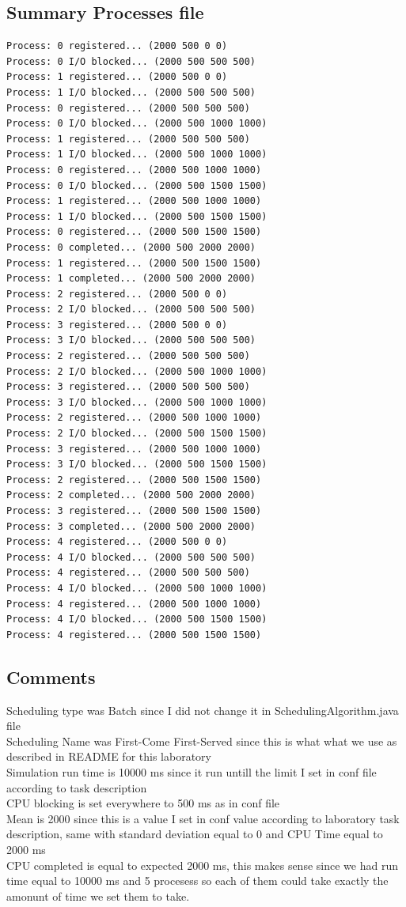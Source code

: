 \subsection{Summary Processes file}
\begin{lstlisting}
Process: 0 registered... (2000 500 0 0)
Process: 0 I/O blocked... (2000 500 500 500)
Process: 1 registered... (2000 500 0 0)
Process: 1 I/O blocked... (2000 500 500 500)
Process: 0 registered... (2000 500 500 500)
Process: 0 I/O blocked... (2000 500 1000 1000)
Process: 1 registered... (2000 500 500 500)
Process: 1 I/O blocked... (2000 500 1000 1000)
Process: 0 registered... (2000 500 1000 1000)
Process: 0 I/O blocked... (2000 500 1500 1500)
Process: 1 registered... (2000 500 1000 1000)
Process: 1 I/O blocked... (2000 500 1500 1500)
Process: 0 registered... (2000 500 1500 1500)
Process: 0 completed... (2000 500 2000 2000)
Process: 1 registered... (2000 500 1500 1500)
Process: 1 completed... (2000 500 2000 2000)
Process: 2 registered... (2000 500 0 0)
Process: 2 I/O blocked... (2000 500 500 500)
Process: 3 registered... (2000 500 0 0)
Process: 3 I/O blocked... (2000 500 500 500)
Process: 2 registered... (2000 500 500 500)
Process: 2 I/O blocked... (2000 500 1000 1000)
Process: 3 registered... (2000 500 500 500)
Process: 3 I/O blocked... (2000 500 1000 1000)
Process: 2 registered... (2000 500 1000 1000)
Process: 2 I/O blocked... (2000 500 1500 1500)
Process: 3 registered... (2000 500 1000 1000)
Process: 3 I/O blocked... (2000 500 1500 1500)
Process: 2 registered... (2000 500 1500 1500)
Process: 2 completed... (2000 500 2000 2000)
Process: 3 registered... (2000 500 1500 1500)
Process: 3 completed... (2000 500 2000 2000)
Process: 4 registered... (2000 500 0 0)
Process: 4 I/O blocked... (2000 500 500 500)
Process: 4 registered... (2000 500 500 500)
Process: 4 I/O blocked... (2000 500 1000 1000)
Process: 4 registered... (2000 500 1000 1000)
Process: 4 I/O blocked... (2000 500 1500 1500)
Process: 4 registered... (2000 500 1500 1500)
\end{lstlisting}    
\subsection{Comments}
Scheduling type was Batch since I did not change it in SchedulingAlgorithm.java
file \\
Scheduling Name was First-Come First-Served since this is what what we use as
described in README for this laboratory \\
Simulation run time is 10000 ms since it run untill the limit I set in conf file
according to task description \\
CPU blocking is set everywhere to 500 ms as in conf file \\
Mean is 2000 since this is a value I set in conf value according to laboratory
task description, same with standard deviation equal to 0 and CPU Time equal to
2000 ms \\
CPU completed is equal to expected 2000 ms, this makes sense since we had run
time equal to 10000 ms and 5 procesess so each of them could take exactly the
amonunt of time we set them to take.


